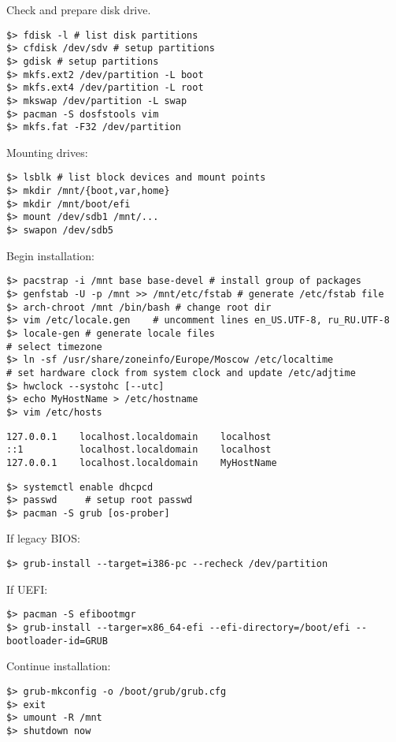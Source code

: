 \documentclass[a4paper, 12pt]{article}
\begin{document}
Check and prepare disk drive.
\begin{lstlisting}
$> fdisk -l # list disk partitions
$> cfdisk /dev/sdv # setup partitions
$> gdisk # setup partitions
$> mkfs.ext2 /dev/partition -L boot
$> mkfs.ext4 /dev/partition -L root
$> mkswap /dev/partition -L swap
$> pacman -S dosfstools vim
$> mkfs.fat -F32 /dev/partition
\end{lstlisting}

Mounting drives:
\begin{lstlisting}
$> lsblk # list block devices and mount points
$> mkdir /mnt/{boot,var,home}
$> mkdir /mnt/boot/efi
$> mount /dev/sdb1 /mnt/...
$> swapon /dev/sdb5
\end{lstlisting}

Begin installation:
\begin{lstlisting}
$> pacstrap -i /mnt base base-devel # install group of packages
$> genfstab -U -p /mnt >> /mnt/etc/fstab # generate /etc/fstab file
$> arch-chroot /mnt /bin/bash # change root dir
$> vim /etc/locale.gen    # uncomment lines en_US.UTF-8, ru_RU.UTF-8
$> locale-gen # generate locale files
# select timezone
$> ln -sf /usr/share/zoneinfo/Europe/Moscow /etc/localtime
# set hardware clock from system clock and update /etc/adjtime
$> hwclock --systohc [--utc]
$> echo MyHostName > /etc/hostname
$> vim /etc/hosts
\end{lstlisting}

\begin{lstlisting}[style=style_file,caption={\path{/etc/hosts} add lines:}]
127.0.0.1    localhost.localdomain    localhost
::1          localhost.localdomain    localhost
127.0.0.1    localhost.localdomain    MyHostName
\end{lstlisting}

\begin{lstlisting}
$> systemctl enable dhcpcd
$> passwd     # setup root passwd
$> pacman -S grub [os-prober]
\end{lstlisting}

If legacy BIOS:
\begin{lstlisting}
$> grub-install --target=i386-pc --recheck /dev/partition
\end{lstlisting}

If UEFI:
\begin{lstlisting}
$> pacman -S efibootmgr
$> grub-install --targer=x86_64-efi --efi-directory=/boot/efi --bootloader-id=GRUB
\end{lstlisting}

Continue installation:
\begin{lstlisting}
$> grub-mkconfig -o /boot/grub/grub.cfg
$> exit
$> umount -R /mnt
$> shutdown now
\end{lstlisting}
\end{document}
